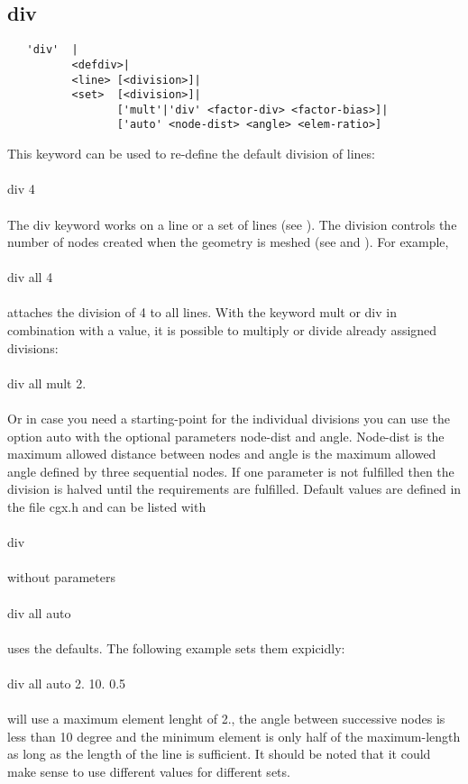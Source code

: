 \documentclass{article}
\begin{document}
\subsection{\label{div}div}
\begin{verbatim}
   'div'  |
          <defdiv>|
          <line> [<division>]|
          <set>  [<division>]|
                 ['mult'|'div' <factor-div> <factor-bias>]|
                 ['auto' <node-dist> <angle> <elem-ratio>] 
\end{verbatim}
This keyword can be used to re-define the default division of lines:\\\\div 4\\\\The div keyword works on a line or a set of lines (see ). The division controls the number of nodes created when the geometry is meshed (see  and ). For example,\\\\
div all 4\\\\attaches the division of 4 to all lines. With the keyword mult or div in combination with a value, it is possible to multiply or divide already assigned divisions:\\\\
div all mult 2.\\\\Or in case you need a starting-point for the individual divisions you can use the option auto with the optional parameters node-dist and angle. Node-dist is the maximum allowed distance between nodes and angle is the maximum allowed angle defined by three sequential nodes. If one parameter is not fulfilled then the division is halved until the requirements are fulfilled. Default values are defined in the file cgx.h and can be listed with\\\\div\\\\without parameters\\\\
div all auto\\\\uses the defaults. The following example sets them expicidly:\\\\div all auto 2. 10. 0.5\\\\will use a maximum element lenght of 2., the angle between successive nodes is less than 10 degree and the minimum element is only half of the maximum-length as long as the length of the line is sufficient. It should be noted that it could make sense to use different values for different sets.
  
\end{document}
